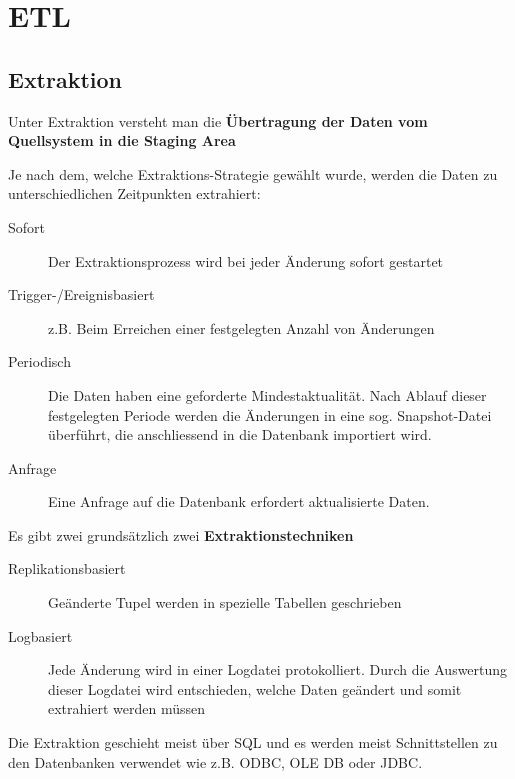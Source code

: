 \documentclass[a4paper, 11pt, nofootinbib]{article}
\begin{document}
\newpage

\section{ETL}
\subsection{Extraktion}

Unter Extraktion versteht man die \textbf{Übertragung der Daten vom Quellsystem in die Staging Area}

\vspace{10px}

\noindent Je nach dem, welche Extraktions-Strategie gewählt wurde, werden die Daten zu unterschiedlichen Zeitpunkten extrahiert:

\begin{description}
	\item[Sofort] Der Extraktionsprozess wird bei jeder Änderung sofort gestartet
	\item[Trigger-/Ereignisbasiert] z.B. Beim Erreichen einer festgelegten Anzahl von Änderungen
	\item[Periodisch] Die Daten haben eine geforderte Mindestaktualität. Nach Ablauf dieser festgelegten Periode werden die Änderungen in eine sog. Snapshot-Datei überführt, die anschliessend in die Datenbank importiert wird.
	\item[Anfrage] Eine Anfrage auf die Datenbank erfordert aktualisierte Daten.
\end{description}

\vspace{10px}

\noindent Es gibt zwei grundsätzlich zwei \textbf{Extraktionstechniken}
\begin{description}
	\item[Replikationsbasiert] Geänderte Tupel werden in spezielle Tabellen geschrieben
	\item[Logbasiert] Jede Änderung wird in einer Logdatei protokolliert. Durch die Auswertung dieser Logdatei wird entschieden, welche Daten geändert und somit extrahiert werden müssen
\end{description}

\noindent Die Extraktion geschieht meist über SQL und es werden meist Schnittstellen zu den Datenbanken verwendet wie z.B. ODBC, OLE DB oder JDBC.

\vspace{10px}
\end{document}
